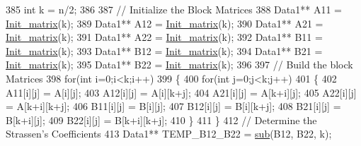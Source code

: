 \begin{DoxyCode}
{       }
385                                 \textcolor{keywordtype}{int} k = n/2;
386 
387                                 \textcolor{comment}{// Initialize the Block Matrices}
388                                 Data1** A11 = \hyperlink{classMATOPS_1_1BigMatrix_a2730be4ce100cfdbaf1240703bd9cfb9}{Init\_matrix}(k);
389                                 Data1** A12 = \hyperlink{classMATOPS_1_1BigMatrix_a2730be4ce100cfdbaf1240703bd9cfb9}{Init\_matrix}(k);
390                                 Data1** A21 = \hyperlink{classMATOPS_1_1BigMatrix_a2730be4ce100cfdbaf1240703bd9cfb9}{Init\_matrix}(k);
391                                 Data1** A22 = \hyperlink{classMATOPS_1_1BigMatrix_a2730be4ce100cfdbaf1240703bd9cfb9}{Init\_matrix}(k);
392                                 Data1** B11 = \hyperlink{classMATOPS_1_1BigMatrix_a2730be4ce100cfdbaf1240703bd9cfb9}{Init\_matrix}(k);
393                                 Data1** B12 = \hyperlink{classMATOPS_1_1BigMatrix_a2730be4ce100cfdbaf1240703bd9cfb9}{Init\_matrix}(k);
394                                 Data1** B21 = \hyperlink{classMATOPS_1_1BigMatrix_a2730be4ce100cfdbaf1240703bd9cfb9}{Init\_matrix}(k);
395                                 Data1** B22 = \hyperlink{classMATOPS_1_1BigMatrix_a2730be4ce100cfdbaf1240703bd9cfb9}{Init\_matrix}(k);
396 
397                                 \textcolor{comment}{// Build the block Matrices}
398                                 \textcolor{keywordflow}{for}(\textcolor{keywordtype}{int} i=0;i<k;i++)
399                                 \{
400                                         \textcolor{keywordflow}{for}(\textcolor{keywordtype}{int} j=0;j<k;j++)
401                                         \{
402                                                 A11[i][j] = A[i][j];
403                                                 A12[i][j] = A[i][k+j];
404                                                 A21[i][j] = A[k+i][j];
405                                                 A22[i][j] = A[k+i][k+j];
406                                                 B11[i][j] = B[i][j];
407                                                 B12[i][j] = B[i][k+j];
408                                                 B21[i][j] = B[k+i][j];
409                                                 B22[i][j] = B[k+i][k+j];
410                                         \}
411                                 \}
412                                 \textcolor{comment}{// Determine the Strassen's Coefficients}
413                                 Data1** TEMP\_B12\_B22 = \hyperlink{classMATOPS_1_1BigMatrix_a5c89e7f360fb3cc32abbf6f1d430fb1f}{sub}(B12, B22, k);

\end{DoxyCode}
